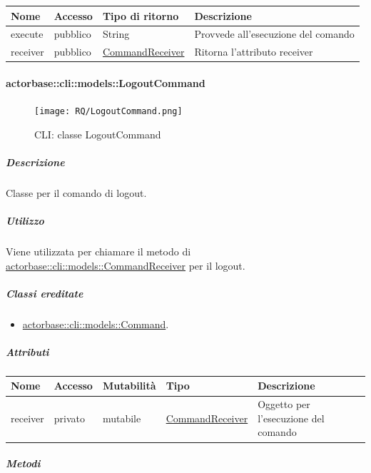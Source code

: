 \documentclass{scalatekids-article}
\begin{document}
\begin{tabular}{| p{3cm} | p{1.5cm} | p{3.5cm} | p{9cm} |}
  \hline
  Nome & Accesso & Tipo di ritorno & Descrizione\\
  \hline
  execute & pubblico & String & Provvede all'esecuzione del comando\\
  \hline
  receiver & pubblico & \hyperref[sec:actorbase::cli::models::CommandReceiver]{CommandReceiver} & Ritorna l'attributo receiver\\
  \hline
\end{tabular}

\paragraph{actorbase::cli::models::LogoutCommand}
\label{sec:actorbase::cli::models::LogoutCommand}

\begin{figure}[H]
  \begin{center}
    \texttt{[image: RQ/LogoutCommand.png]}
    \caption{CLI: classe LogoutCommand}
  \end{center}
\end{figure}

\subparagraph{Descrizione}

Classe per il comando di logout.

\subparagraph{Utilizzo}

Viene utilizzata per chiamare il metodo di
\hyperref[sec:actorbase::cli::models::CommandReceiver]{actorbase::cli::models::CommandReceiver} per il logout.

\subparagraph{Classi ereditate}

\begin{itemize}
\item \hyperref[sec:actorbase::cli::models::Command]{actorbase::cli::models::Command}.
\end{itemize}

\subparagraph{Attributi}

\begin{tabular}{| p{1cm} | p{1.5cm} | p{2cm} | p{4cm} | p{8.5cm} |}
  \hline
  Nome & Accesso & Mutabilità & Tipo & Descrizione\\
  \hline
  receiver & privato & mutabile & \hyperref[sec:actorbase::cli::models::CommandReceiver]{CommandReceiver} & Oggetto per l'esecuzione del comando\\
  \hline
\end{tabular}

\subparagraph{Metodi}
\end{document}
